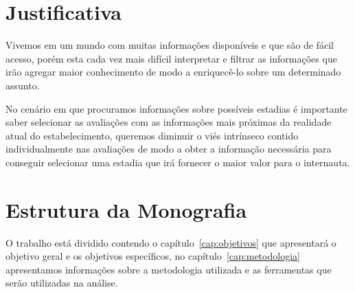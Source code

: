 \section{Justificativa}

Vivemos em um mundo com muitas informações disponíveis e que são de fácil acesso, porém esta cada vez mais difícil interpretar e filtrar as informações que irão agregar maior conhecimento de modo a enriquecê-lo sobre um determinado assunto.

No cenário em que procuramos informações sobre possíveis estadias é importante saber selecionar as avaliações com as informações mais próximas da realidade atual do estabelecimento, queremos diminuir o viés intrínseco contido individualmente nas avaliações de modo a obter a informação necessária para conseguir selecionar uma estadia que irá fornecer o maior valor para o internauta.

\section{Estrutura da Monografia}

O trabalho está dividido contendo o capítulo~\ref{cap:objetivos} que apresentará o objetivo geral e os objetivos específicos, no capítulo~\ref{cap:metodologia} apresentamos informações sobre a metodologia utilizada e as ferramentas que serão utilizadas na análise.
